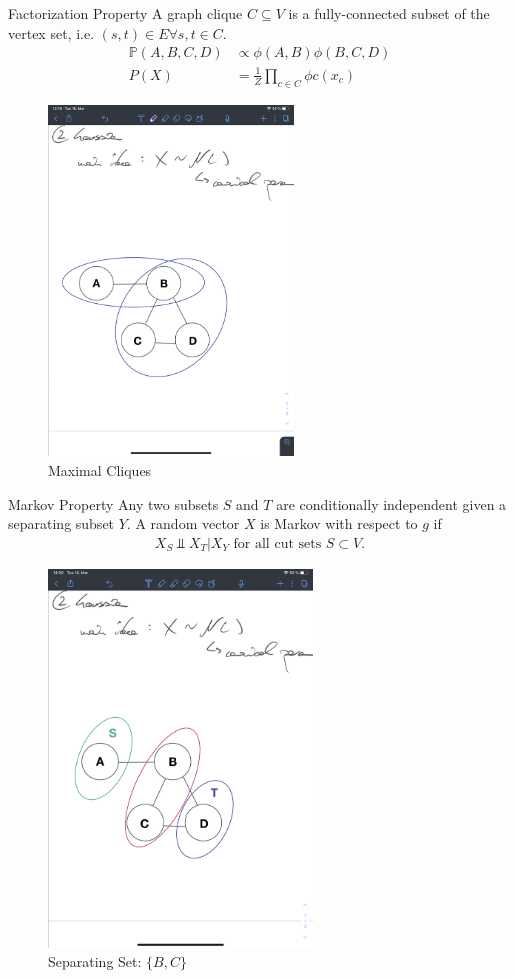 \documentclass{beamer}
\begin{document}
\begin{frame}{Factorization Property}
A graph clique $C \subseteq V$ is a fully-connected subset of the vertex set, i.e. $(s,t) \in E \forall s,t \in C$. \cite{hastie2015statistical}
\begin{align*}
	\mathbb{P}(A, B, C, D) &\propto \phi(A,B) \phi(B, C, D) \\
	P(X) &= \frac{1}{Z} \prod_{c \in C} \phi c (x_c)
\end{align*}
\begin{figure}
	\caption{Maximal Cliques}
	\includegraphics[trim={2cm 18cm 10cm 35cm}, clip, width = 6.5cm]{graphs/IMG_0093}
\end{figure}
\end{frame}

\begin{frame}{Markov Property}
Any two subsets $S$ and $T$ are conditionally independent given a separating subset $Y$. A random vector $X$ is Markov with respect to $g$ if
\begin{align*}
	X_S \Perp X_T | X_Y \text{ for all cut sets } S \subset V.
\end{align*}
\begin{figure}
	\caption{Separating Set: $\{ B, C\}$}
	\includegraphics[trim={2cm 2cm 10cm 32cm}, clip, width = 7cm]{graphs/IMG_0094}
\end{figure}
\end{frame}
\end{document}

